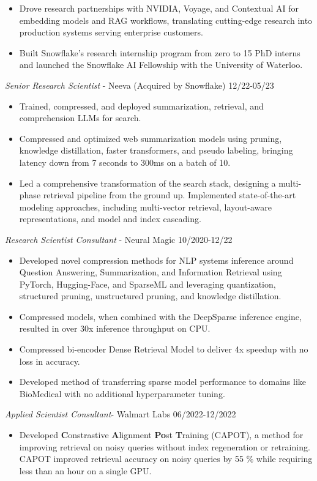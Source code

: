 \documentclass[line,margin]{res}
\begin{document}
\begin{resume}
\begin{itemize}
\item Drove research partnerships with NVIDIA, Voyage, and Contextual AI for embedding models and RAG workflows, translating cutting-edge research into production systems serving enterprise customers.
\item Built Snowflake's research internship program from zero to 15 PhD interns and launched the Snowflake AI Fellowship with the University of Waterloo. 
\end{itemize}
{\sl Senior Research Scientist} - Neeva (Acquired by Snowflake) \hfill  12/22-05/23
\begin{itemize}  \itemsep -4pt 
\item Trained, compressed, and deployed summarization, retrieval, and comprehension LLMs for search.
\item Compressed and optimized web summarization models using pruning, knowledge distillation, faster transformers, and pseudo labeling, bringing latency down from 7 seconds to 300ms on a batch of 10.
\item Led a comprehensive transformation of the search stack, designing a multi-phase retrieval pipeline from the ground up. Implemented state-of-the-art modeling approaches, including multi-vector retrieval, layout-aware representations, and model and index cascading.
\end{itemize}
{\sl Research Scientist Consultant} - Neural Magic \hfill  10/2020-12/22
\begin{itemize}  \itemsep -4pt 
\item Developed novel compression methods for NLP systems inference around Question Answering, Summarization, and Information Retrieval using PyTorch, Hugging-Face, and SparseML and leveraging quantization, structured pruning, unstructured pruning, and knowledge distillation. 
\item Compressed models,  when combined with the DeepSparse inference engine, resulted in over 30x inference throughput on CPU. 
\item Compressed bi-encoder Dense Retrieval Model to deliver 4x speedup with no loss in accuracy.
\item Developed method of transferring sparse model performance to domains like BioMedical with no additional hyperparameter tuning.
\end{itemize}
{\sl Applied Scientist Consultant}- Walmart Labs \hfill 06/2022-12/2022
\begin{itemize}  \itemsep -4pt 
\item Developed \textbf{C}onstrastive \textbf{A}lignment \textbf{Po}st \textbf{T}raining (CAPOT), a method for improving retrieval on noisy queries without index regeneration or retraining. CAPOT improved retrieval accuracy on noisy queries by 55 \% while requiring less than an hour on a single GPU.

\end{itemize}
\end{resume}
\end{document}

